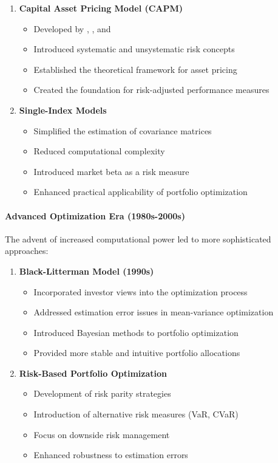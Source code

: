 \begin{enumerate}
    \item \textbf{Capital Asset Pricing Model (CAPM)}
    \begin{itemize}
        \item Developed by \parencite{sharpe1964capital}, \parencite{lintner1965security}, and \parencite{mossin1966equilibrium}
        \item Introduced systematic and unsystematic risk concepts
        \item Established the theoretical framework for asset pricing
        \item Created the foundation for risk-adjusted performance measures
    \end{itemize}

    \item \textbf{Single-Index Models}
    \begin{itemize}
        \item Simplified the estimation of covariance matrices
        \item Reduced computational complexity
        \item Introduced market beta as a risk measure
        \item Enhanced practical applicability of portfolio optimization
    \end{itemize}
\end{enumerate}

\paragraph{Advanced Optimization Era (1980s-2000s)}
The advent of increased computational power led to more sophisticated approaches:

\begin{enumerate}
    \item \textbf{Black-Litterman Model (1990s)}
    \begin{itemize}
        \item Incorporated investor views into the optimization process
        \item Addressed estimation error issues in mean-variance optimization
        \item Introduced Bayesian methods to portfolio optimization
        \item Provided more stable and intuitive portfolio allocations
    \end{itemize}

    \item \textbf{Risk-Based Portfolio Optimization}
    \begin{itemize}
        \item Development of risk parity strategies \parencite{qian2005risk}
        \item Introduction of alternative risk measures (VaR, CVaR)
        \item Focus on downside risk management
        \item Enhanced robustness to estimation errors
    \end{itemize}
\end{enumerate}

